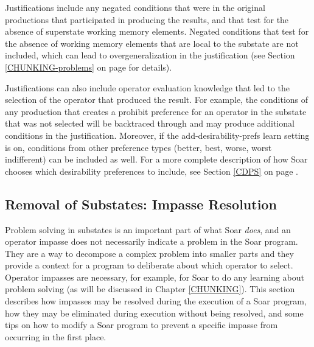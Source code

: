 Justifications include any negated conditions that were in the original
productions that participated in producing the results, and that test for the
absence of superstate working memory elements. Negated conditions that test for
the absence of working memory elements that are local to the substate are not
included, which can lead to overgeneralization in the justification (see Section
\ref{CHUNKING-problems} on page \pageref{CHUNKING-problems} for details).

Justifications can also include operator evaluation knowledge that led to the
selection of the operator that produced the result.  For example, the conditions
of any production that creates a prohibit preference for an operator in the substate that was not selected will be backtraced through
and may produce additional conditions in the justification.  Moreover, if the
add-desirability-prefs learn setting is on, conditions from other preference
types (better, best, worse, worst indifferent) can be included as well.  For a more
complete description of how Soar chooses which desirability preferences to
include, see Section \ref{CDPS} on page \pageref{CDPS}.

\subsection{Removal of Substates: Impasse Resolution}
\label{ARCH-impasses-elimination}

Problem solving in substates is an important part of what Soar
\textit{does}, and an operator impasse does not necessarily indicate a
problem in the Soar program.  They are a way to decompose a complex
problem into smaller parts and they provide a context for a program to
deliberate about which operator to select.  Operator impasses are necessary, for
example, for Soar to do any learning about problem solving (as will be
discussed in Chapter \ref{CHUNKING}). This section describes how
impasses may be resolved during the execution of a Soar program, how
they may be eliminated during execution without being resolved, and some
tips on how to modify a Soar program to prevent a specific impasse from
occurring in the first place.  

